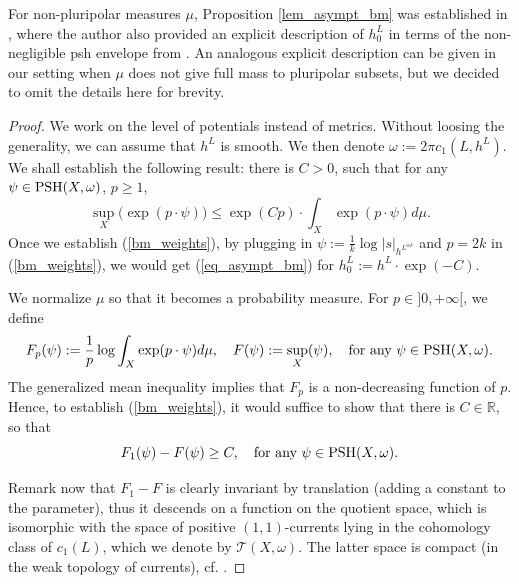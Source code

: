 \documentclass[12pt]{article}
\numberwithin{equation}{section}
\theoremstyle{theorem}
\theoremstyle{definition}
\theoremstyle{remark}
\newcommand{\real}{\mathbb{R}}
\begin{document}
	For non-pluripolar measures $\mu$, Proposition \ref{lem_asympt_bm} was established in \cite[Theorem~7.1]{FinEigToepl}, 
where the author also provided an explicit description of $h^L_0$ in terms of the non-negligible psh envelope from \cite{GuedjLuZeriahEnv}.  
	An analogous explicit description can be given in our setting when $\mu$ does not give full mass to pluripolar subsets, but we decided to omit the details here for brevity.
	\begin{proof}
		We work on the level of potentials instead of metrics. 
		Without loosing the generality, we can assume that $h^L$ is smooth.
		We then denote $\omega := 2 \pi c_1(L, h^L)$.
		We shall establish the following result: there is $C > 0$, such that for any $\psi \in {\rm{PSH}}(X, \omega)$, $p \geq 1$, 
		\begin{equation}\label{bm_weights}
			\sup_X \big( \exp(p \cdot \psi) \big)
			\leq
			\exp(C p)
			\cdot
			\int_X \exp(p \cdot \psi) d \mu.
		\end{equation}
		Once we establish (\ref{bm_weights}), by plugging in $\psi := \frac{1}{k} \log |s|_{h^{L^{\otimes k}}}$ and $p = 2 k$ in (\ref{bm_weights}), we would get (\ref{eq_asympt_bm}) for $h^L_0 := h^L \cdot \exp(- C)$.
		\par 
		We normalize $\mu$ so that it becomes a probability measure.
		For $p \in ]0, +\infty[$, we define
		\begin{equation}
			F_p(\psi) := \frac{1}{p} \log \int_X \exp(p \cdot \psi ) d \mu, 
			\quad 
			F(\psi) := \sup_X (\psi),
			\quad 
			\text{for any }\psi \in {\rm{PSH}}(X, \omega).
		\end{equation}
		The generalized mean inequality implies that $F_p$ is a non-decreasing function of $p$.
		Hence, to establish (\ref{bm_weights}), it would suffice to show that there is $C \in \real$, so that 
		\begin{equation}\label{eq_bnd_low}
			F_1(\psi) - F(\psi) \geq C, \quad \text{for any } \psi \in {\rm{PSH}}(X, \omega).
		\end{equation}
		\par 
		Remark now that $F_1 - F$ is clearly invariant by translation (adding a constant to the parameter), thus it descends on a function on the quotient space, which is isomorphic with the space of positive $(1, 1)$-currents lying in the cohomology class of $c_1(L)$, which we denote by $\mathcal{T}(X, \omega)$.
		The latter space is compact (in the weak topology of currents), cf. \cite[Proposition 8.5]{GuedjZeriahBook}.
		\par 

\end{proof}
\end{document}
